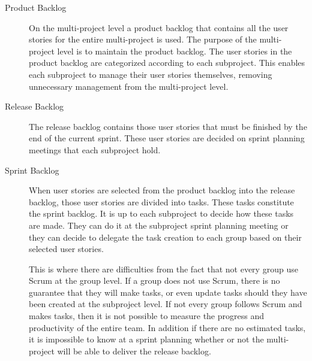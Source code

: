 \begin{description}

\item[Product Backlog]
On the multi-project level a product backlog that contains all the user stories for the entire multi-project is used.  
The purpose of the multi-project level is to maintain the product backlog. The user stories in the product backlog are categorized according to each subproject. This enables each subproject to manage their user stories themselves, removing unnecessary management from the multi-project level.

\item[Release Backlog]
The release backlog contains those user stories that must be finished by the end of the current sprint. These user stories are decided on sprint planning meetings that each subproject hold.

\item[Sprint Backlog]
When user stories are selected from the product backlog into the release backlog, those user stories are divided into tasks. These tasks constitute the sprint backlog. It is up to each subproject to decide how these tasks are made. They can do it at the subproject sprint planning meeting or they can decide to delegate the task creation to each group based on their selected user stories.

This is where there are difficulties from the fact that not every group use Scrum at the group level. If a group does not use Scrum, there is no guarantee that they will make tasks, or even update tasks should they have been created at the subproject level. If not every group follows Scrum and makes tasks, then it is not possible to measure the progress and productivity of the entire team. In addition if there are no estimated tasks, it is impossible to know at a sprint planning whether or not the multi-project will be able to deliver the release backlog.

\end{description}

